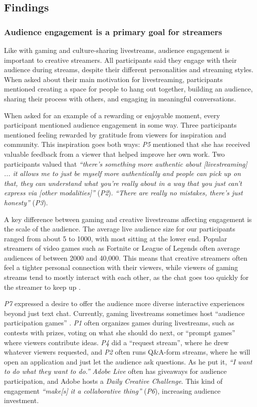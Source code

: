 \subsection{Findings}
\subsubsection{Audience engagement is a primary goal for streamers}
Like with gaming \cite{Pellicone2017, Hamilton2014} and culture-sharing \cite{Lu2019} livestreams, audience engagement is important to creative streamers. All participants said they engage with their audience during streams, despite their different personalities and streaming styles. When asked about their main motivation for livestreaming, participants mentioned creating a space for people to hang out together, building an audience, sharing their process with others, and engaging in meaningful conversations.

When asked for an example of a rewarding or enjoyable moment, every participant mentioned audience engagement in some way. Three participants mentioned feeling rewarded by gratitude from viewers for inspiration and community. This inspiration goes both ways: \textit{P5} mentioned that she has received valuable feedback from a viewer that helped improve her own work. Two participants valued that \textit{``there's something more authentic about [livestreaming] ... it allows me to just be myself more authentically and people can pick up on that, they can understand what you're really about in a way that you just can't express via [other modalities]''} (\textit{P2}). \textit{``There are really no mistakes, there's just honesty''} (\textit{P3}).

A key difference between gaming and creative livestreams affecting engagement is the scale of the audience. The average live audience size for our participants ranged from about 5 to 1000, with most sitting at the lower end. Popular streamers of video games such as Fortnite or League of Legends often average audiences of between 2000 and 40,000. This means that creative streamers often feel a tighter personal connection with their viewers, while viewers of gaming streams tend to mostly interact with each other, as the chat goes too quickly for the streamer to keep up \cite{Lessel2017, Hu2017}.

\textit{P7} expressed a desire to offer the audience more diverse interactive experiences beyond just text chat. Currently, gaming livestreams sometimes host ``audience participation games'' \cite{Glickman2018}. \textit{P1} often organizes games during livestreams, such as contests with prizes, voting on what she should do next, or ``prompt games'' where viewers contribute ideas. \textit{P4} did a ``request stream'', where he drew whatever viewers requested, and \textit{P2} often runs Q\&A-form streams, where he will open an application and just let the audience ask questions. As he put it, \textit{``I want to do what they want to do.''} \textit{Adobe Live} often has giveaways for audience participation, and Adobe hosts a \textit{Daily Creative Challenge}. This kind of engagement \textit{``make[s] it a collaborative thing''} (\textit{P6}), increasing audience investment.

